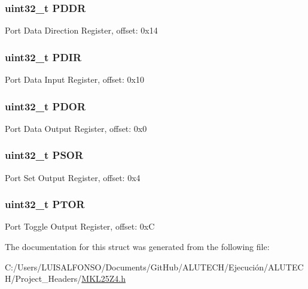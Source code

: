 \subsubsection[{P\+D\+D\+R}]{\setlength{\rightskip}{0pt plus 5cm}uint32\+\_\+t P\+D\+D\+R}\label{struct_g_p_i_o___mem_map_a37eee18eef001998403709bf78f4a33d}
Port Data Direction Register, offset\+: 0x14 \hypertarget{struct_g_p_i_o___mem_map_a4c83a78320344c89b1663969a7c5d749}{}
\subsubsection[{P\+D\+I\+R}]{\setlength{\rightskip}{0pt plus 5cm}uint32\+\_\+t P\+D\+I\+R}\label{struct_g_p_i_o___mem_map_a4c83a78320344c89b1663969a7c5d749}
Port Data Input Register, offset\+: 0x10 \hypertarget{struct_g_p_i_o___mem_map_a6d8857d2ca1928bcedd1a83e93946aef}{}
\subsubsection[{P\+D\+O\+R}]{\setlength{\rightskip}{0pt plus 5cm}uint32\+\_\+t P\+D\+O\+R}\label{struct_g_p_i_o___mem_map_a6d8857d2ca1928bcedd1a83e93946aef}
Port Data Output Register, offset\+: 0x0 \hypertarget{struct_g_p_i_o___mem_map_a2fc5ff57bdc9e1de4233930468cbf5e3}{}
\subsubsection[{P\+S\+O\+R}]{\setlength{\rightskip}{0pt plus 5cm}uint32\+\_\+t P\+S\+O\+R}\label{struct_g_p_i_o___mem_map_a2fc5ff57bdc9e1de4233930468cbf5e3}
Port Set Output Register, offset\+: 0x4 \hypertarget{struct_g_p_i_o___mem_map_a2a8b6ad3b774b37fcdf9a0f04f56e43b}{}
\subsubsection[{P\+T\+O\+R}]{\setlength{\rightskip}{0pt plus 5cm}uint32\+\_\+t P\+T\+O\+R}\label{struct_g_p_i_o___mem_map_a2a8b6ad3b774b37fcdf9a0f04f56e43b}
Port Toggle Output Register, offset\+: 0x\+C 

The documentation for this struct was generated from the following file\+:\begin{DoxyCompactItemize}
\item 
C\+:/\+Users/\+L\+U\+I\+S\+A\+L\+F\+O\+N\+S\+O/\+Documents/\+Git\+Hub/\+A\+L\+U\+T\+E\+C\+H/\+Ejecución/\+A\+L\+U\+T\+E\+C\+H/\+Project\+\_\+\+Headers/\hyperlink{_m_k_l25_z4_8h}{M\+K\+L25\+Z4.\+h}\end{DoxyCompactItemize}
